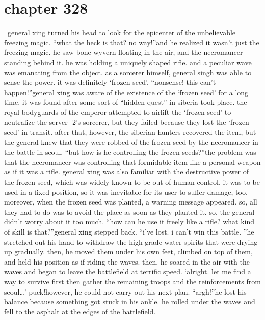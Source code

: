 \section{chapter 328}






 general xing turned his head to look for the epicenter of the unbelievable freezing magic.
“what the heck is that? no way!”and he realized it wasn’t just the freezing magic.
he saw bone wyvern floating in the air, and the necromancer standing behind it.
 he was holding a uniquely shaped rifle.
 and a peculiar wave was emanating from the object.
as a sorcerer himself, general singh was able to sense the power.
 it was definitely ‘frozen seed’.
“nonsense! this can’t happen!”general xing was aware of the existence of the ‘frozen seed’ for a long time.
 it was found after some sort of “hidden quest” in siberia took place.
the royal bodyguards of the emperor attempted to airlift the ‘frozen seed’ to neutralize the server- 2’s sorcerer, but they failed because they lost the ‘frozen seed’ in transit.
after that, however, the siberian hunters recovered the item, but the general knew that they were robbed of the frozen seed by the necromancer in the battle in seoul.
“but how is he controlling the frozen seeds?”the problem was that the necromancer was controlling that formidable item like a personal weapon as if it was a rifle.
general xing was also familiar with the destructive power of the frozen seed, which was widely known to be out of human control.
 it was to be used in a fixed position, so it was inevitable for its user to suffer damage, too.
moreover, when the frozen seed was planted, a warning message appeared.
 so, all they had to do was to avoid the place as soon as they planted it.
 so, the general didn’t worry about it too much.
“how can he use it freely like a rifle? what kind of skill is that?”general xing stepped back.
“i’ve lost.
 i can’t win this battle.
”he stretched out his hand to withdraw the high-grade water spirits that were drying up gradually.
then, he moved them under his own feet, climbed on top of them, and held his position as if riding the waves.
 then, he soared in the air with the waves and began to leave the battlefield at terrific speed.
‘alright.
 let me find a way to survive first then gather the remaining troops and the reinforcements from seoul…’
puck!however, he could not carry out his next plan.
“argh!”he lost his balance because something got stuck in his ankle.
 he rolled under the waves and fell to the asphalt at the edges of the battlefield.
